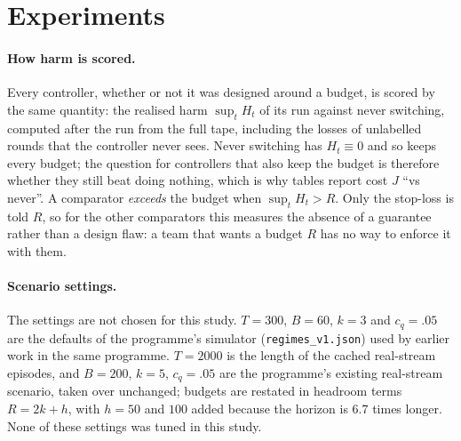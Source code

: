 \documentclass[10pt]{article}
\theoremstyle{plain}
\theoremstyle{definition}
\begin{document}
\section{Experiments}\label{sec:exp}
\paragraph{How harm is scored.}
Every controller, whether or not it was designed around a budget, is scored by the same quantity: the realised harm $\sup_tH_t$ of its run against never switching, computed after the run from the full tape, including the losses of unlabelled rounds that the controller never sees. Never switching has $H_t\equiv0$ and so keeps every budget; the question for controllers that also keep the budget is therefore whether they still beat doing nothing, which is why tables report cost $J$ ``vs never''. A comparator \emph{exceeds} the budget when $\sup_tH_t>R$. Only the stop-loss is told $R$, so for the other comparators this measures the absence of a guarantee rather than a design flaw: a team that wants a budget $R$ has no way to enforce it with them.

\paragraph{Scenario settings.}
The settings are not chosen for this study. $T=300$, $B=60$, $k=3$ and $c_q=.05$ are the defaults of the programme's simulator (\texttt{regimes\_v1.json}) used by earlier work in the same programme. $T=2000$ is the length of the cached real-stream episodes, and $B=200$, $k=5$, $c_q=.05$ are the programme's existing real-stream scenario, taken over unchanged; budgets are restated in headroom terms $R=2k+h$, with $h=50$ and $100$ added because the horizon is $6.7$ times longer. None of these settings was tuned in this study.
\end{document}
